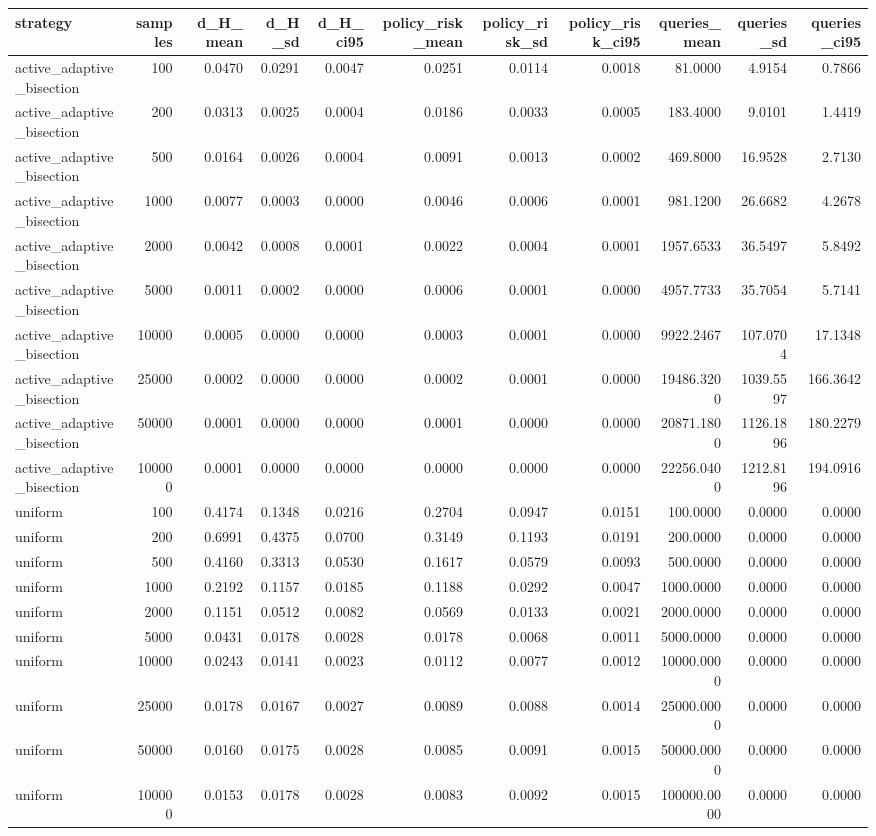 \begin{tabular}{lrrrrrrrrrr}
\toprule
strategy & samples & d_H_mean & d_H_sd & d_H_ci95 & policy_risk_mean & policy_risk_sd & policy_risk_ci95 & queries_mean & queries_sd & queries_ci95 \\
\midrule
active_adaptive_bisection & 100 & 0.0470 & 0.0291 & 0.0047 & 0.0251 & 0.0114 & 0.0018 & 81.0000 & 4.9154 & 0.7866 \\
active_adaptive_bisection & 200 & 0.0313 & 0.0025 & 0.0004 & 0.0186 & 0.0033 & 0.0005 & 183.4000 & 9.0101 & 1.4419 \\
active_adaptive_bisection & 500 & 0.0164 & 0.0026 & 0.0004 & 0.0091 & 0.0013 & 0.0002 & 469.8000 & 16.9528 & 2.7130 \\
active_adaptive_bisection & 1000 & 0.0077 & 0.0003 & 0.0000 & 0.0046 & 0.0006 & 0.0001 & 981.1200 & 26.6682 & 4.2678 \\
active_adaptive_bisection & 2000 & 0.0042 & 0.0008 & 0.0001 & 0.0022 & 0.0004 & 0.0001 & 1957.6533 & 36.5497 & 5.8492 \\
active_adaptive_bisection & 5000 & 0.0011 & 0.0002 & 0.0000 & 0.0006 & 0.0001 & 0.0000 & 4957.7733 & 35.7054 & 5.7141 \\
active_adaptive_bisection & 10000 & 0.0005 & 0.0000 & 0.0000 & 0.0003 & 0.0001 & 0.0000 & 9922.2467 & 107.0704 & 17.1348 \\
active_adaptive_bisection & 25000 & 0.0002 & 0.0000 & 0.0000 & 0.0002 & 0.0001 & 0.0000 & 19486.3200 & 1039.5597 & 166.3642 \\
active_adaptive_bisection & 50000 & 0.0001 & 0.0000 & 0.0000 & 0.0001 & 0.0000 & 0.0000 & 20871.1800 & 1126.1896 & 180.2279 \\
active_adaptive_bisection & 100000 & 0.0001 & 0.0000 & 0.0000 & 0.0000 & 0.0000 & 0.0000 & 22256.0400 & 1212.8196 & 194.0916 \\
uniform & 100 & 0.4174 & 0.1348 & 0.0216 & 0.2704 & 0.0947 & 0.0151 & 100.0000 & 0.0000 & 0.0000 \\
uniform & 200 & 0.6991 & 0.4375 & 0.0700 & 0.3149 & 0.1193 & 0.0191 & 200.0000 & 0.0000 & 0.0000 \\
uniform & 500 & 0.4160 & 0.3313 & 0.0530 & 0.1617 & 0.0579 & 0.0093 & 500.0000 & 0.0000 & 0.0000 \\
uniform & 1000 & 0.2192 & 0.1157 & 0.0185 & 0.1188 & 0.0292 & 0.0047 & 1000.0000 & 0.0000 & 0.0000 \\
uniform & 2000 & 0.1151 & 0.0512 & 0.0082 & 0.0569 & 0.0133 & 0.0021 & 2000.0000 & 0.0000 & 0.0000 \\
uniform & 5000 & 0.0431 & 0.0178 & 0.0028 & 0.0178 & 0.0068 & 0.0011 & 5000.0000 & 0.0000 & 0.0000 \\
uniform & 10000 & 0.0243 & 0.0141 & 0.0023 & 0.0112 & 0.0077 & 0.0012 & 10000.0000 & 0.0000 & 0.0000 \\
uniform & 25000 & 0.0178 & 0.0167 & 0.0027 & 0.0089 & 0.0088 & 0.0014 & 25000.0000 & 0.0000 & 0.0000 \\
uniform & 50000 & 0.0160 & 0.0175 & 0.0028 & 0.0085 & 0.0091 & 0.0015 & 50000.0000 & 0.0000 & 0.0000 \\
uniform & 100000 & 0.0153 & 0.0178 & 0.0028 & 0.0083 & 0.0092 & 0.0015 & 100000.0000 & 0.0000 & 0.0000 \\
\bottomrule
\end{tabular}
